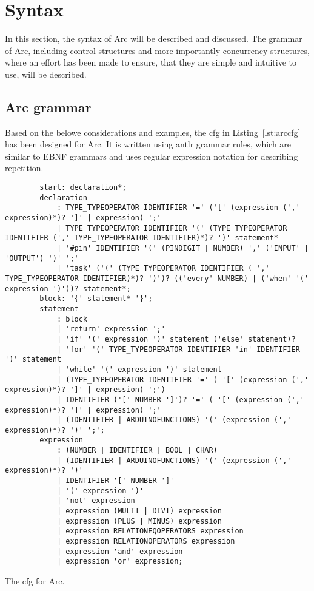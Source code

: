 \section{Syntax}\label{sec:syntax}
In this section, the syntax of Arc will be described and discussed. The grammar of Arc, including control structures and more importantly concurrency structures, where an effort has been made to ensure, that they are simple and intuitive to use, will be described.

\subsection{Arc grammar}\label{sec:arcgrammar}
Based on the belowe considerations and examples, the \gls{cfg} in Listing~\ref{lst:arccfg} has been designed for Arc. It is written using \gls{antlr} grammar rules, which are similar to EBNF grammars and uses regular expression notation for describing repetition.


\begin{listing}[htb!]
    \begin{verbatim}
        start: declaration*;
        declaration
            : TYPE_TYPEOPERATOR IDENTIFIER '=' ('[' (expression (',' expression)*)? ']' | expression) ';'
            | TYPE_TYPEOPERATOR IDENTIFIER '(' (TYPE_TYPEOPERATOR IDENTIFIER (',' TYPE_TYPEOPERATOR IDENTIFIER)*)? ')' statement*
            | '#pin' IDENTIFIER '(' (PINDIGIT | NUMBER) ',' ('INPUT' | 'OUTPUT') ')' ';'
            | 'task' ('(' (TYPE_TYPEOPERATOR IDENTIFIER ( ',' TYPE_TYPEOPERATOR IDENTIFIER)*)? ')')? (('every' NUMBER) | ('when' '(' expression ')'))? statement*;
        block: '{' statement* '}';
        statement
            : block
            | 'return' expression ';'
            | 'if' '(' expression ')' statement ('else' statement)?
            | 'for' '(' TYPE_TYPEOPERATOR IDENTIFIER 'in' IDENTIFIER ')' statement
            | 'while' '(' expression ')' statement
            | (TYPE_TYPEOPERATOR IDENTIFIER '=' ( '[' (expression (',' expression)*)? ']' | expression) ';')
            | IDENTIFIER ('[' NUMBER ']')? '=' ( '[' (expression (',' expression)*)? ']' | expression) ';'
            | (IDENTIFIER | ARDUINOFUNCTIONS) '(' (expression (',' expression)*)? ')' ';';
        expression
            : (NUMBER | IDENTIFIER | BOOL | CHAR)
            | (IDENTIFIER | ARDUINOFUNCTIONS) '(' (expression (',' expression)*)? ')'
            | IDENTIFIER '[' NUMBER ']'
            | '(' expression ')'
            | 'not' expression
            | expression (MULTI | DIVI) expression
            | expression (PLUS | MINUS) expression
            | expression RELATIONEQOPERATORS expression
            | expression RELATIONOPERATORS expression
            | expression 'and' expression
            | expression 'or' expression;
    \end{verbatim}
    \caption{The \gls{cfg} for Arc.}
    \label{lst:arccfg}
\end{listing}


